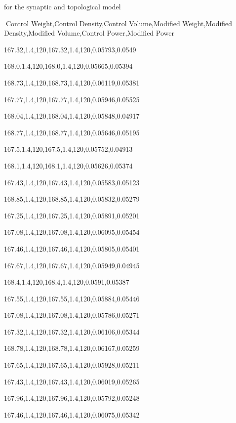 for the synaptic and topological model

Control Weight,Control Density,Control Volume,Modified Weight,Modified
Density,Modified Volume,Control Power,Modified Power

167.32,1.4,120,167.32,1.4,120,0.05793,0.0549

168.0,1.4,120,168.0,1.4,120,0.05665,0.05394

168.73,1.4,120,168.73,1.4,120,0.06119,0.05381

167.77,1.4,120,167.77,1.4,120,0.05946,0.05525

168.04,1.4,120,168.04,1.4,120,0.05848,0.04917

168.77,1.4,120,168.77,1.4,120,0.05646,0.05195

167.5,1.4,120,167.5,1.4,120,0.05752,0.04913

168.1,1.4,120,168.1,1.4,120,0.05626,0.05374

167.43,1.4,120,167.43,1.4,120,0.05583,0.05123

168.85,1.4,120,168.85,1.4,120,0.05832,0.05279

167.25,1.4,120,167.25,1.4,120,0.05891,0.05201

167.08,1.4,120,167.08,1.4,120,0.06095,0.05454

167.46,1.4,120,167.46,1.4,120,0.05805,0.05401

167.67,1.4,120,167.67,1.4,120,0.05949,0.04945

168.4,1.4,120,168.4,1.4,120,0.0591,0.05387

167.55,1.4,120,167.55,1.4,120,0.05884,0.05446

167.08,1.4,120,167.08,1.4,120,0.05786,0.05271

167.32,1.4,120,167.32,1.4,120,0.06106,0.05344

168.78,1.4,120,168.78,1.4,120,0.06167,0.05259

167.65,1.4,120,167.65,1.4,120,0.05928,0.05211

167.43,1.4,120,167.43,1.4,120,0.06019,0.05265

167.96,1.4,120,167.96,1.4,120,0.05792,0.05248

167.46,1.4,120,167.46,1.4,120,0.06075,0.05342

